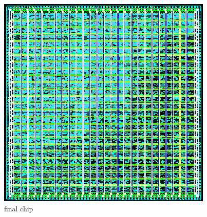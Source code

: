 \documentclass[../main.tex]{subfiles}
\begin{document}
\begin{figure}[h!]
    \centering
    \includegraphics[width=10 cm]{diagrams/finished.png}
    \caption{final chip}
    \label{fig:finished}
\end{figure}
\end{document}
